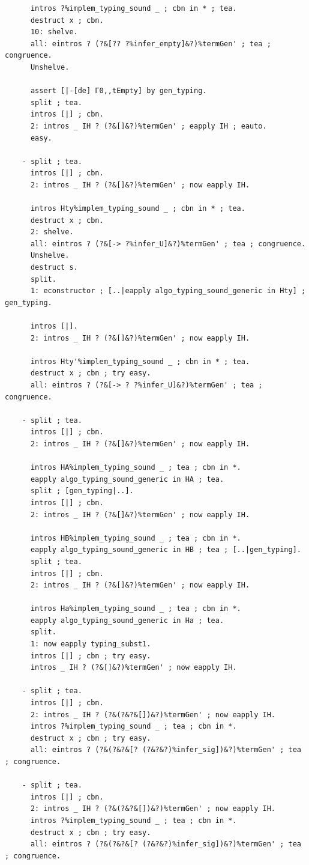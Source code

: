 \documentclass[10pt,a4paper]{amsart}
\begin{document}
\begin{lstlisting}
      intros ?%implem_typing_sound _ ; cbn in * ; tea.
      destruct x ; cbn.
      10: shelve.
      all: eintros ? (?&[?? ?%infer_empty]&?)%termGen' ; tea ; congruence.
      Unshelve.

      assert [|-[de] Γ0,,tEmpty] by gen_typing.
      split ; tea.
      intros [|] ; cbn.
      2: intros _ IH ? (?&[]&?)%termGen' ; eapply IH ; eauto.
      easy.
    
    - split ; tea.
      intros [|] ; cbn.
      2: intros _ IH ? (?&[]&?)%termGen' ; now eapply IH.
      
      intros Hty%implem_typing_sound _ ; cbn in * ; tea.
      destruct x ; cbn.
      2: shelve.
      all: eintros ? (?&[-> ?%infer_U]&?)%termGen' ; tea ; congruence.
      Unshelve.
      destruct s.
      split.
      1: econstructor ; [..|eapply algo_typing_sound_generic in Hty] ; gen_typing.

      intros [|].
      2: intros _ IH ? (?&[]&?)%termGen' ; now eapply IH.

      intros Hty'%implem_typing_sound _ ; cbn in * ; tea.
      destruct x ; cbn ; try easy.
      all: eintros ? (?&[-> ? ?%infer_U]&?)%termGen' ; tea ; congruence.

    - split ; tea.
      intros [|] ; cbn.
      2: intros _ IH ? (?&[]&?)%termGen' ; now eapply IH.

      intros HA%implem_typing_sound _ ; tea ; cbn in *.
      eapply algo_typing_sound_generic in HA ; tea.
      split ; [gen_typing|..].
      intros [|] ; cbn.
      2: intros _ IH ? (?&[]&?)%termGen' ; now eapply IH.

      intros HB%implem_typing_sound _ ; tea ; cbn in *.
      eapply algo_typing_sound_generic in HB ; tea ; [..|gen_typing].
      split ; tea.
      intros [|] ; cbn.
      2: intros _ IH ? (?&[]&?)%termGen' ; now eapply IH.

      intros Ha%implem_typing_sound _ ; tea ; cbn in *.
      eapply algo_typing_sound_generic in Ha ; tea.
      split.
      1: now eapply typing_subst1.
      intros [|] ; cbn ; try easy.
      intros _ IH ? (?&[]&?)%termGen' ; now eapply IH.

    - split ; tea.
      intros [|] ; cbn.
      2: intros _ IH ? (?&(?&?&[])&?)%termGen' ; now eapply IH.
      intros ?%implem_typing_sound _ ; tea ; cbn in *.
      destruct x ; cbn ; try easy.
      all: eintros ? (?&(?&?&[? (?&?&?)%infer_sig])&?)%termGen' ; tea ; congruence.

    - split ; tea.
      intros [|] ; cbn.
      2: intros _ IH ? (?&(?&?&[])&?)%termGen' ; now eapply IH.
      intros ?%implem_typing_sound _ ; tea ; cbn in *.
      destruct x ; cbn ; try easy.
      all: eintros ? (?&(?&?&[? (?&?&?)%infer_sig])&?)%termGen' ; tea ; congruence.


\end{lstlisting}
\end{document}
